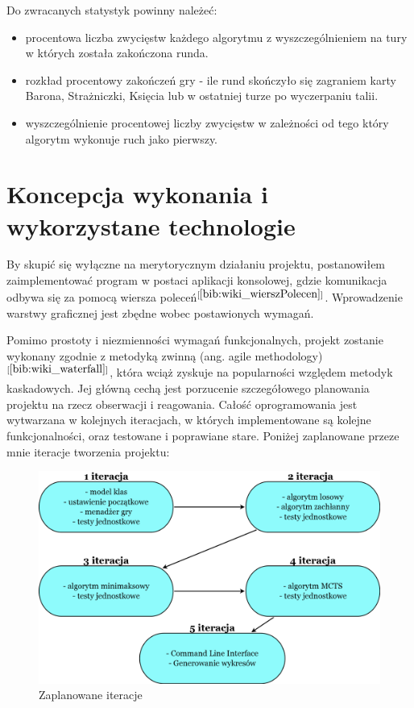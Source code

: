 Do zwracanych statystyk powinny należeć:
\begin{itemize}
	\item procentowa liczba zwycięstw każdego algorytmu z wyszczególnieniem na tury w których została zakończona runda.
	\item rozkład procentowy zakończeń gry - ile rund skończyło się zagraniem karty Barona, Strażniczki, Księcia lub w ostatniej turze po wyczerpaniu talii.
	\item wyszczególnienie procentowej liczby zwycięstw w zależności od tego który algorytm wykonuje ruch jako pierwszy.
\end{itemize}


\section{Koncepcja wykonania i wykorzystane technologie}
By skupić się wyłączne na merytorycznym działaniu projektu, postanowiłem zaimplementować program w postaci aplikacji konsolowej, gdzie komunikacja odbywa się za pomocą wiersza poleceń$^{[\ref{bib:wiki_wierszPolecen}]}$. Wprowadzenie warstwy graficznej jest zbędne wobec postawionych wymagań.

Pomimo prostoty i niezmienności wymagań funkcjonalnych, projekt zostanie wykonany zgodnie z metodyką zwinną (ang. agile methodology)$^{[\ref{bib:wiki_waterfall}]}$, która wciąż zyskuje na popularności względem metodyk kaskadowych. Jej główną cechą jest porzucenie szczegółowego planowania projektu na rzecz obserwacji i reagowania. Całość oprogramowania jest wytwarzana w kolejnych iteracjach, w których implementowane są kolejne funkcjonalności, oraz testowane i poprawiane stare. Poniżej zaplanowane przeze mnie iteracje tworzenia projektu:

\begin{figure}[H]
	\centering
	\includegraphics[width=\textwidth]{Resources/DiagramIteracji.png}
	\caption{Zaplanowane iteracje} 
	\label{fig:llMainImage}
\end{figure}

